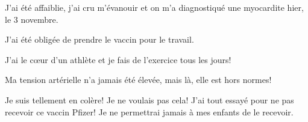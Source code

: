 J'ai été affaiblie, j'ai cru m'évanouir et on m'a diagnostiqué une myocardite
hier, le 3 novembre.

J'ai été obligée de prendre le vaccin pour le travail.

J'ai le cœur d'un athlète et je fais de l'exercice tous les jours!

Ma tension artérielle n'a jamais été élevée, mais là, elle est hors normes!

Je suis tellement en colère! Je ne voulais pas cela! J'ai tout essayé pour ne
pas recevoir ce vaccin Pfizer! Je ne permettrai jamais à mes enfants de le
recevoir.

